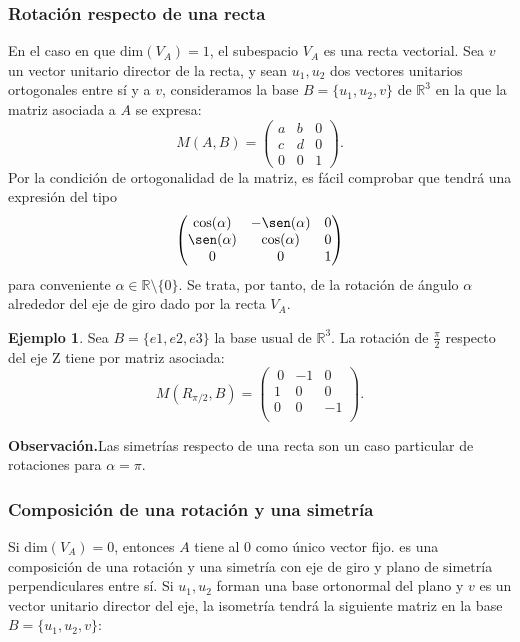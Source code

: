 \documentclass[11pt]{article}
\theoremstyle{definition}
\newtheorem{ejemplo}{Ejemplo}[section]
\begin{document}
\subsubsection{Rotación respecto de una recta}
En el caso en que $\mathrm{dim}(V_A)=1$, el subespacio $V_A$ es una recta vectorial. Sea $v$ un vector unitario director de la recta, y sean $u_1,u_2$ dos vectores unitarios ortogonales entre sí y a $v$, consideramos la base $B=\{u_1,u_2,v\}$ de $\mathbb R^3$ en la que la matriz asociada a $A$ se expresa:
    \[M(A, B)=\begin{pmatrix}a&b&0\\c&d&0\\0&0&1\end{pmatrix}.\]
Por la condición de ortogonalidad de la matriz, es fácil comprobar que tendrá una expresión del tipo
    \[\begin{pmatrix}\cos(\alpha)&-\sen(\alpha)&0\\\sen(\alpha)&\cos(\alpha)&0\\0&0&1\end{pmatrix}\]
    para conveniente $\alpha\in \mathbb R\setminus\{0\}$. Se trata, por tanto, de la rotación de ángulo $\alpha$ alrededor del eje de giro dado por la recta $V_A$.


\begin{ejemplo}
Sea $B=\{e1 , e2 , e3\}$ la base usual de  $\mathbb{R}^3$. La rotación de $\frac\pi 2$ respecto del eje Z tiene por matriz asociada:  
\[M(R_{\pi/2},B)=
    \begin{pmatrix} 
    \ 0 & -1 & 0 \\ 1 & 0 & 0 \\ 0 & 0 & -1 \\ 
    \end{pmatrix}.
  \]
\end{ejemplo}

\noindent\textbf{Observación.}\quad Las simetrías respecto de una recta son un caso particular de rotaciones para $\alpha=\pi$.
    \\

\subsubsection{Composición de una rotación y una simetría}

Si $\mathrm{dim}(V_A)=0$, entonces $A$ tiene al $0$ como único vector fijo. es una composición de una rotación y una simetría con eje de giro y plano de simetría perpendiculares entre sí. Si $u_1, u_2$ forman una base ortonormal del plano y $v$ es un vector unitario director del eje, la isometría tendrá la siguiente matriz en la base $B=\{u_1,u_2,v\}$:
\end{document}
